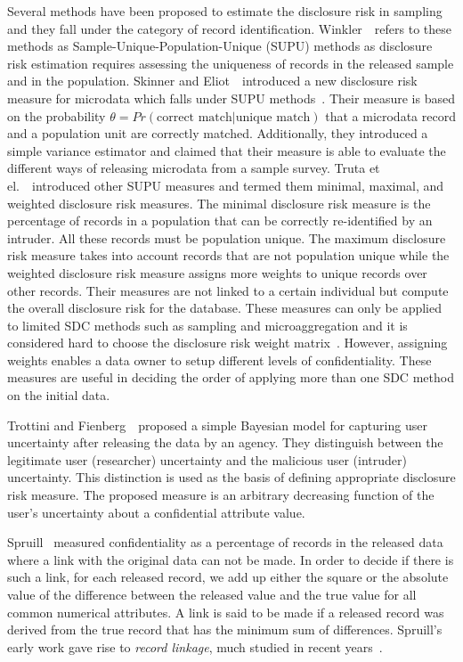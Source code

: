 \documentclass{llncs}
\begin{document}
Several methods have been proposed to estimate the disclosure risk
in sampling and they fall under the category of record
identification. Winkler~\cite{Winkler:Masking04}~refers to these
methods as Sample-Unique-Population-Unique (SUPU) methods as
disclosure risk estimation requires assessing the uniqueness of
records in the released sample and in the population. Skinner and
Eliot~\cite{Skinner-Elliot:Measure02}~introduced a new disclosure
risk measure for microdata which falls under SUPU
methods~\cite{Winkler:Masking04}. Their measure is based on the
probability $\theta=Pr(\mbox{correct match}|\mbox{unique match})$
that a microdata record and a population unit are correctly
matched.
Additionally, they introduced a
simple variance estimator and  claimed that their measure is
able to evaluate the different ways of releasing microdata from a
sample survey. Truta et
el.~\cite{Truta-Fotouhi:Disclosure04}~introduced other SUPU
measures and termed them minimal, maximal, and weighted
disclosure risk measures. The minimal disclosure risk measure is
the percentage of records in a population that can be correctly
re-identified by an intruder. All these records must be population
unique. The maximum disclosure risk measure takes into account
records that are not population unique while the weighted
disclosure risk measure assigns more weights to unique records
over other records. Their measures are not linked to a certain
individual but compute the overall disclosure risk for the
database. These measures can only be applied to limited SDC
methods such as sampling and microaggregation and it is considered
hard to choose the disclosure risk weight
matrix~\cite{Truta-Fotouhi:Disclosure04}. However, assigning
weights enables a data owner to setup different levels of
confidentiality. These measures are useful in deciding the order
of applying more than one SDC method on the initial data.

Trottini and Fienberg~\cite{Trottini-Fienberg:Modelling02}~proposed
a simple Bayesian model for capturing user uncertainty after
releasing the data by an agency. They distinguish between the
legitimate user (researcher) uncertainty and the malicious user
(intruder) uncertainty. This distinction is used as the basis of
defining appropriate disclosure risk measure. The proposed measure
is an arbitrary decreasing function of the user's uncertainty
about a confidential attribute value.

Spruill~\cite{Spruill:Measures82}
measured confidentiality as a percentage of records in the
released data where a link with the original
 data can not be made. In
order to decide if there is such a link, for each released record,
we add up either the square or the absolute value of the difference between the released value and the true
value for all common numerical attributes. A link is said to be made if a
released record was derived from the true record that has the
minimum sum of differences. Spruill's early work gave rise to \emph{record linkage}, much studied in recent years~\cite{FungWangChenYu2010}.
\end{document}
